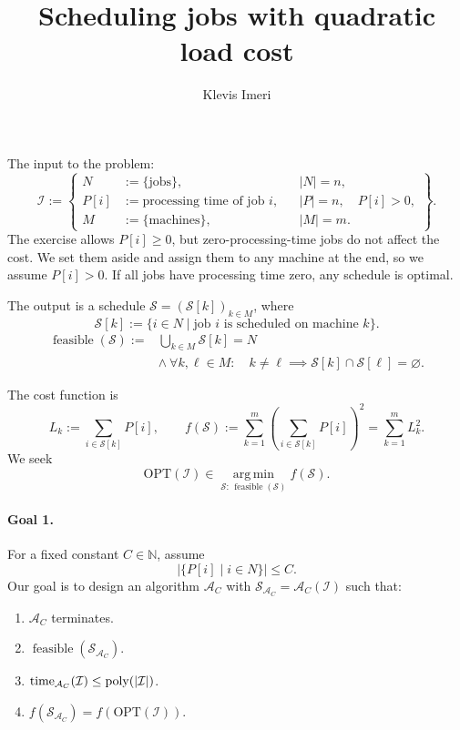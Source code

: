 \documentclass[12pt,a4paper]{article}
\title{Scheduling jobs with quadratic load cost}
\author{Klevis Imeri}
\date{}
\theoremstyle{definition}
\theoremstyle{plain}
\begin{document}
\maketitle

The input to the problem:
\[
\mathcal{I} := \left\{
\begin{aligned}
N &:= \{\text{jobs}\}, && |N|=n,\\
P[i] &:= \text{processing time of job }i, && |P|=n,\quad P[i]>0,\\
M &:= \{\text{machines}\}, && |M|=m.
\end{aligned}
\right\}.
\]
The exercise allows $P[i]\geq0$, but zero-processing-time jobs do not
affect the cost. We set them aside and assign them to any machine at the
end, so we assume $P[i]>0$. If all jobs have processing time zero, any
schedule is optimal.

The output is a schedule $\mathcal{S}=(\mathcal{S}[k])_{k\in M}$, where
\[
\mathcal{S}[k] := \{i\in N\mid \text{job }i\text{ is scheduled on machine }k\}.
\]
\[
\begin{aligned}
\operatorname{feasible}(\mathcal{S}) := {}&
\bigcup_{k\in M}\mathcal{S}[k]=N\\
&\land\ \forall k,\ell\in M:\quad
k\neq\ell\implies\mathcal{S}[k]\cap\mathcal{S}[\ell]=\varnothing.
\end{aligned}
\]

The cost function is
\[
L_k := \sum_{i\in\mathcal{S}[k]}P[i],
\qquad
f(\mathcal{S}) := \sum_{k=1}^{m}\left(\sum_{i\in\mathcal{S}[k]}P[i]\right)^2
=\sum_{k=1}^{m}L_k^2.
\]
We seek
\[
\mathrm{OPT}(\mathcal{I})\in
\operatorname*{arg\,min}_{\mathcal{S}:\,\operatorname{feasible}(\mathcal{S})}
f(\mathcal{S}).
\]

\paragraph{Goal 1.}
For a fixed constant $C\in\mathbb{N}$, assume
\[
\bigl|\{P[i]\mid i\in N\}\bigr|\leq C.
\]
Our goal is to design an algorithm $\mathcal{A}_C$ with
$\mathcal{S}_{\mathcal{A}_C}=\mathcal{A}_C(\mathcal{I})$ such that:
\begin{enumerate}
\item $\mathcal{A}_C$ terminates.
\item $\operatorname{feasible}(\mathcal{S}_{\mathcal{A}_C})$.
\item $\operatorname{time}_{\mathcal{A}_C}(\mathcal{I})\leq\operatorname{poly}(|\mathcal{I}|)$.
\item $f(\mathcal{S}_{\mathcal{A}_C})=f(\mathrm{OPT}(\mathcal{I}))$.
\end{enumerate}
\end{document}
